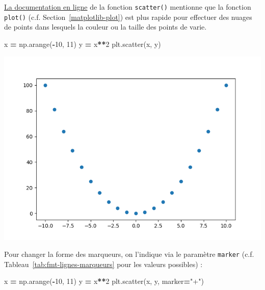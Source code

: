 \documentclass[12pt,]{book}
\newenvironment{Shaded}{\begin{snugshade}}{\end{snugshade}}
\newcommand{\DecValTok}[1]{\textcolor[rgb]{0.00,0.00,0.81}{#1}}
\newcommand{\StringTok}[1]{\textcolor[rgb]{0.31,0.60,0.02}{#1}}
\newcommand{\OperatorTok}[1]{\textcolor[rgb]{0.81,0.36,0.00}{\textbf{#1}}}
\newcommand{\NormalTok}[1]{#1}
\numberwithin{equation}{section}
\numberwithin{countremarque}{section}
\let\BeginKnitrBlock\begin \let\EndKnitrBlock\end
\begin{document}
\BeginKnitrBlock{remarque}
\href{https://matplotlib.org/2.0.2/api/pyplot_api.html\#matplotlib.pyplot.scatter}{La
documentation en ligne} de la fonction \texttt{scatter()} mentionne que
la fonction \texttt{plot()} (c.f. Section~\ref{matplotlib-plot}) est
plus rapide pour effectuer des nuages de points dans lesquels la couleur
ou la taille des points de varie.
\EndKnitrBlock{remarque}

\begin{Shaded}
\begin{Highlighting}[]
\NormalTok{x }\OperatorTok{=}\NormalTok{ np.arange(}\OperatorTok{-}\DecValTok{10}\NormalTok{, }\DecValTok{11}\NormalTok{)}
\NormalTok{y }\OperatorTok{=}\NormalTok{ x}\OperatorTok{**}\DecValTok{2}
\NormalTok{plt.scatter(x, y)}
\end{Highlighting}
\end{Shaded}

\begin{center}\includegraphics[width=9.03in]{figs/pyplot/scatter_1} \end{center}

Pour changer la forme des marqueurs, on l'indique via le paramètre
\texttt{marker} (c.f. Tableau~\ref{tab:fmt-lignes-marqueurs} pour les
valeurs possibles) :

\begin{Shaded}
\begin{Highlighting}[]
\NormalTok{x }\OperatorTok{=}\NormalTok{ np.arange(}\OperatorTok{-}\DecValTok{10}\NormalTok{, }\DecValTok{11}\NormalTok{)}
\NormalTok{y }\OperatorTok{=}\NormalTok{ x}\OperatorTok{**}\DecValTok{2}
\NormalTok{plt.scatter(x, y, marker}\OperatorTok{=}\StringTok{"+"}\NormalTok{)}
\end{Highlighting}
\end{Shaded}
\end{document}
